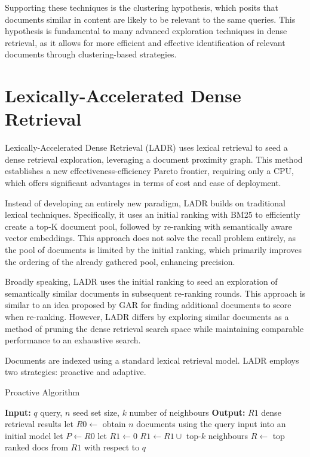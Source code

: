 \documentclass[sigconf,authorversion,nonacm]{acmart}
\begin{document}
Supporting these techniques is the clustering hypothesis\cite{clustering_hypothesis}, which posits that documents similar in
content are likely to be relevant to the same queries. This hypothesis is fundamental to many
advanced exploration techniques in dense retrieval, as it allows for more efficient and effective
identification of relevant documents through clustering-based strategies.
\section{Lexically-Accelerated Dense Retrieval}

Lexically-Accelerated Dense Retrieval (LADR)\cite{ladr} uses lexical retrieval to seed a dense retrieval
exploration, leveraging a document proximity graph. This method establishes a new
effectiveness-efficiency Pareto frontier, requiring only a CPU, which offers significant advantages
in terms of cost and ease of deployment.

Instead of developing an entirely new paradigm, LADR builds on traditional lexical techniques.
Specifically, it uses an initial ranking with BM25 to efficiently create a top-K document pool,
followed by re-ranking with semantically aware vector embeddings. This approach does not solve the
recall problem entirely, as the pool of documents is limited by the initial ranking, which primarily
improves the ordering of the already gathered pool, enhancing precision.

Broadly speaking, LADR uses the initial ranking to seed an exploration of semantically similar
documents in subsequent re-ranking rounds. This approach is similar to an idea proposed by
GAR\cite{gar} for finding additional documents to score when re-ranking. However, LADR differs by
exploring similar documents as a method of pruning the dense retrieval search space while
maintaining comparable performance to an exhaustive search.

Documents are indexed using a standard lexical retrieval model. LADR employs two strategies:
proactive and adaptive.

\begin{algorithm}
	\caption{Proactive Algorithm}
	\begin{algorithmic}[1]
		\STATE \textbf{Input:} \( q \) query, \( n \) seed set size, \( k \) number of neighbours
		\STATE \textbf{Output:} \( R1 \) dense retrieval results
		\STATE let \( R0 \leftarrow \) obtain \( n \) documents using the query input into an initial model
		\STATE let \( P \leftarrow R0 \)
		\STATE let \( R1 \leftarrow 0 \)
		\STATE \( R1 \leftarrow R1 \cup \) top-\( k \) neighbours
		\STATE \( R \leftarrow \) top ranked docs from \( R1 \) with respect to \( q \)
	\end{algorithmic}
\end{algorithm}
\end{document}
